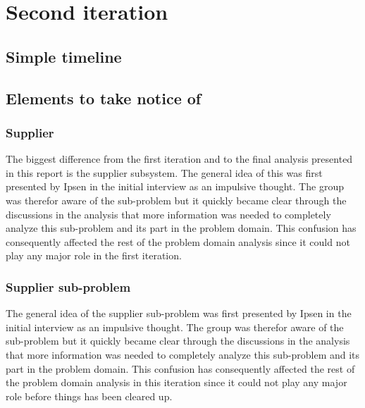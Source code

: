 \section{Second iteration}
\subsection{Simple timeline}

\subsection{Elements to take notice of}
\subsubsection*{Supplier} 
The biggest difference from the first iteration and to the final analysis presented in this report is the supplier subsystem.
The general idea of this was first presented by Ipsen in the initial interview as an impulsive thought. 
The group was therefor aware of the sub-problem but it quickly became clear through the discussions in the analysis that more information was needed to completely analyze this sub-problem and its part in the problem domain.
This confusion has consequently affected the rest of the problem domain analysis since it could not play any major role in the first iteration.


\subsubsection*{Supplier sub-problem}
The general idea of the supplier sub-problem was first presented by Ipsen in the initial interview as an impulsive thought. 
The group was therefor aware of the sub-problem but it quickly became clear through the discussions in the analysis that more information was needed to completely analyze this sub-problem and its part in the problem domain.
This confusion has consequently affected the rest of the problem domain analysis in this iteration since it could not play any major role  before things has been cleared up.

